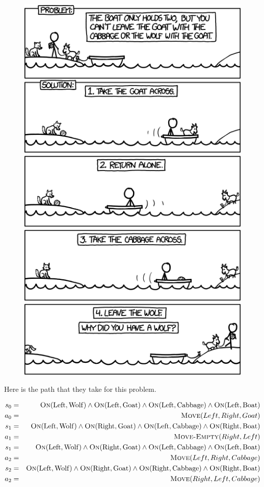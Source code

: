 \documentclass[11pt]{article}
\begin{document}
\begin{figure}
  \centering
  \includegraphics[width=0.6\linewidth]{pics/logic_boat}
  \label{fig:goat}
\end{figure}

Here is the path that they take for this problem. 

\begin{eqnarray*}
 s_0 & = & \mathrm{\textsc{On}}(\mathrm{Left}, \mathrm{Wolf}) \land \mathrm{\textsc{On}}(\mathrm{Left}, \mathrm{Goat}) \land \mathrm{\textsc{On}}(\mathrm{Left}, \mathrm{Cabbage}) \land \mathrm{\textsc{On}}(\mathrm{Left}, \mathrm{Boat}) \\
a_0 & = &  \mathrm{\textsc{Move}}(Left, Right, Goat) \\
 s_1 & = & \mathrm{\textsc{On}}(\mathrm{Left}, \mathrm{Wolf}) \land \mathrm{\textsc{On}}(\mathrm{Right}, \mathrm{Goat}) \land \mathrm{\textsc{On}}(\mathrm{Left}, \mathrm{Cabbage}) \land \mathrm{\textsc{On}}(\mathrm{Right}, \mathrm{Boat}) \\
a_1 & = &  \mathrm{\textsc{Move-Empty}}(Right, Left) \\
 s_1 & = & \mathrm{\textsc{On}}(\mathrm{Left}, \mathrm{Wolf}) \land \mathrm{\textsc{On}}(\mathrm{Right}, \mathrm{Goat}) \land \mathrm{\textsc{On}}(\mathrm{Left}, \mathrm{Cabbage}) \land \mathrm{\textsc{On}}(\mathrm{Left}, \mathrm{Boat}) \\
a_2 & = &  \mathrm{\textsc{Move}}(Left, Right, Cabbage) \\
s_2 & = & \mathrm{\textsc{On}}(\mathrm{Left}, \mathrm{Wolf}) \land \mathrm{\textsc{On}}(\mathrm{Right}, \mathrm{Goat}) \land \mathrm{\textsc{On}}(\mathrm{Right}, \mathrm{Cabbage}) \land \mathrm{\textsc{On}}(\mathrm{Right}, \mathrm{Boat}) \\
a_2 & = &  \mathrm{\textsc{Move}}(Right, Left, Cabbage) \\
\end{eqnarray*}
\end{document}
